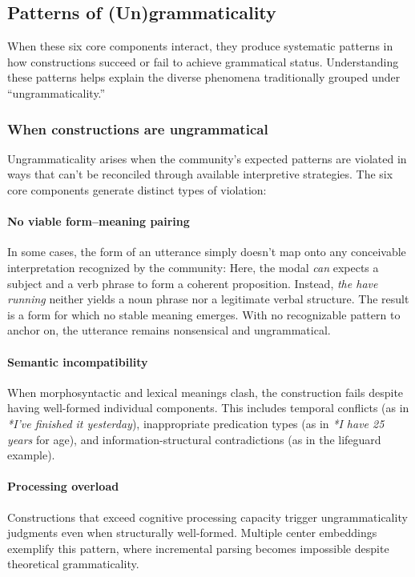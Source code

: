 \documentclass[12pt,letterpaper]{article}
\begin{document}
\subsection{Patterns of (Un)grammaticality}\label{sec:patterns}

When these six core components interact, they produce systematic patterns in how constructions succeed or fail to achieve grammatical status. Understanding these patterns helps explain the diverse phenomena traditionally grouped under ``ungrammaticality.''

\subsubsection{When constructions are ungrammatical}\label{sec:ungrammatical}

Ungrammaticality arises when the community's expected patterns are violated in ways that can't be reconciled through available interpretive strategies. The six core components generate distinct types of violation:

\paragraph{No viable form--meaning pairing}
In some cases, the form of an utterance simply doesn't map onto any conceivable interpretation recognized by the community:
\label{ex:running-pattern}
\z
Here, the modal \textit{can} expects a subject and a verb phrase to form a coherent proposition. Instead, \textit{the have running} neither yields a noun phrase nor a legitimate verbal structure. The result is a form for which no stable meaning emerges. With no recognizable pattern to anchor on, the utterance remains nonsensical and ungrammatical.

\paragraph{Semantic incompatibility}
When morphosyntactic and lexical meanings clash, the construction fails despite having well-formed individual components. This includes temporal conflicts (as in \textit{*I've finished it yesterday}), inappropriate predication types (as in \textit{*I have 25 years} for age), and information-structural contradictions (as in the lifeguard example).

\paragraph{Processing overload}
Constructions that exceed cognitive processing capacity trigger ungrammaticality judgments even when structurally well-formed. Multiple center embeddings exemplify this pattern, where incremental parsing becomes impossible despite theoretical grammaticality.
\end{document}
